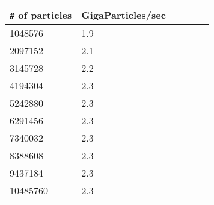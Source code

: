 \documentclass[letterpaper,10pt]{article} %
\begin{document}
\begin{table}  [ht]
    \centering
        \begin{tabular}{llllll}
        \verb|#| of particles & GigaParticles/sec \\ \hline 
                      1048576 & 1.9\\ 
                      2097152 & 2.1\\ 
                      3145728 & 2.2\\ 
                      4194304 & 2.3\\ 
                      5242880 & 2.3\\ 
                      6291456 & 2.3\\ 
                      7340032 & 2.3\\ 
                      8388608 & 2.3\\ 
                      9437184 & 2.3\\ 
                     10485760 & 2.3
            \end{tabular}
    \end{table}

    
\end{document}
